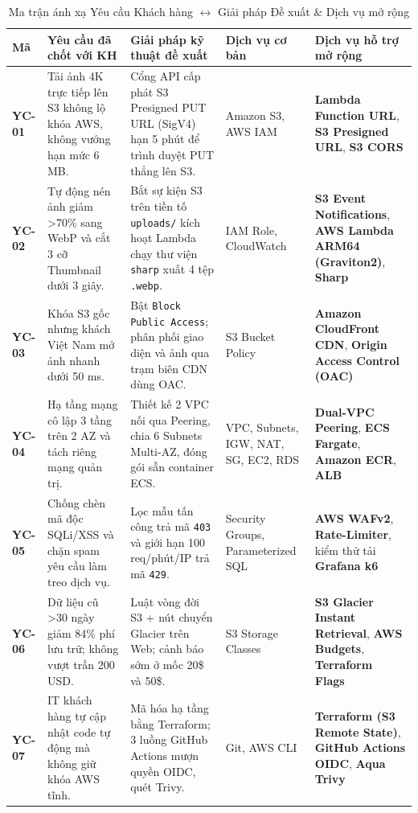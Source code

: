 \documentclass[12pt,a4paper]{report}
\begin{document}
\begin{table}[H]
  \centering
  \caption{Ma trận ánh xạ Yêu cầu Khách hàng $\leftrightarrow$ Giải pháp Đề xuất \& Dịch vụ mở rộng}
  \label{tab:matran}
  \scriptsize
  \renewcommand{\arraystretch}{1.25}
  \begin{tabularx}{\textwidth}{|C{1.1cm}|L{3.5cm}|Y|L{2.5cm}|L{3.2cm}|}
    \hline
    \textbf{Mã} & \textbf{Yêu cầu đã chốt với KH} & \textbf{Giải pháp kỹ thuật đề xuất} & \textbf{Dịch vụ cơ bản} & \textbf{Dịch vụ hỗ trợ mở rộng} \\
    \hline
    \textbf{YC-01} & Tải ảnh 4K trực tiếp lên S3 không lộ khóa AWS, không vướng hạn mức 6 MB. & Cổng API cấp phát S3 Presigned PUT URL (SigV4) hạn 5 phút để trình duyệt PUT thẳng lên S3. & Amazon S3, AWS IAM & \textbf{Lambda Function URL}, \textbf{S3 Presigned URL}, \textbf{S3 CORS} \\ \hline
    \textbf{YC-02} & Tự động nén ảnh giảm >70\% sang WebP và cắt 3 cỡ Thumbnail dưới 3 giây. & Bắt sự kiện S3 trên tiền tố \texttt{uploads/} kích hoạt Lambda chạy thư viện \texttt{sharp} xuất 4 tệp \texttt{.webp}. & IAM Role, CloudWatch & \textbf{S3 Event Notifications}, \textbf{AWS Lambda ARM64 (Graviton2)}, \textbf{Sharp} \\ \hline
    \textbf{YC-03} & Khóa S3 gốc nhưng khách Việt Nam mở ảnh nhanh dưới 50 ms. & Bật \texttt{Block Public Access}; phân phối giao diện và ảnh qua trạm biên CDN dùng OAC. & S3 Bucket Policy & \textbf{Amazon CloudFront CDN}, \textbf{Origin Access Control (OAC)} \\ \hline
    \textbf{YC-04} & Hạ tầng mạng cô lập 3 tầng trên 2 AZ và tách riêng mạng quản trị. & Thiết kế 2 VPC nối qua Peering, chia 6 Subnets Multi-AZ, đóng gói sẵn container ECS. & VPC, Subnets, IGW, NAT, SG, EC2, RDS & \textbf{Dual-VPC Peering}, \textbf{ECS Fargate}, \textbf{Amazon ECR}, \textbf{ALB} \\ \hline
    \textbf{YC-05} & Chống chèn mã độc SQLi/XSS và chặn spam yêu cầu làm treo dịch vụ. & Lọc mẫu tấn công trả mã \texttt{403} và giới hạn 100 req/phút/IP trả mã \texttt{429}. & Security Groups, Parameterized SQL & \textbf{AWS WAFv2}, \textbf{Rate-Limiter}, kiểm thử tải \textbf{Grafana k6} \\ \hline
    \textbf{YC-06} & Dữ liệu cũ >30 ngày giảm 84\% phí lưu trữ; không vượt trần 200 USD. & Luật vòng đời S3 + nút chuyển Glacier trên Web; cảnh báo sớm ở mốc 20\$ và 50\$. & S3 Storage Classes & \textbf{S3 Glacier Instant Retrieval}, \textbf{AWS Budgets}, \textbf{Terraform Flags} \\ \hline
    \textbf{YC-07} & IT khách hàng tự cập nhật code tự động mà không giữ khóa AWS tĩnh. & Mã hóa hạ tầng bằng Terraform; 3 luồng GitHub Actions mượn quyền OIDC, quét Trivy. & Git, AWS CLI & \textbf{Terraform (S3 Remote State)}, \textbf{GitHub Actions OIDC}, \textbf{Aqua Trivy} \\ \hline
  \end{tabularx}
\end{table}
\end{document}
